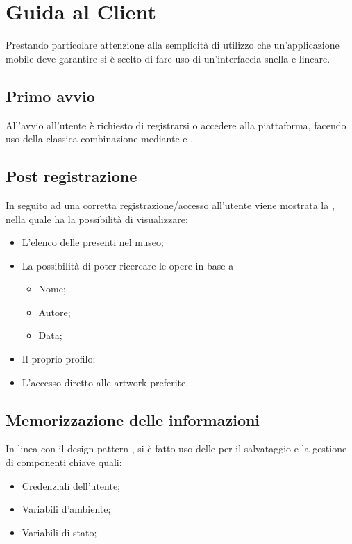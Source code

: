   \section{Guida al Client}
    Prestando particolare attenzione alla semplicità di utilizzo che un'applicazione mobile deve garantire si è scelto di fare uso di un’interfaccia snella e lineare.
    \subsection{Primo avvio}
      All'avvio all'utente è richiesto di registrarsi o accedere alla piattaforma, facendo uso della classica combinazione mediante  e .

    \subsection{Post registrazione}
      In seguito ad una corretta registrazione/accesso all'utente viene mostrata la , nella quale ha la possibilità di visualizzare:
      \begin{itemize}
        \item L'elenco delle  presenti nel museo;
        \item La possibilità di poter ricercare le opere in base a
          \begin{itemize}
            \item Nome;
            \item Autore;
            \item Data;
          \end{itemize}
        \item Il proprio profilo;
        \item L'accesso diretto alle artwork preferite.
      \end{itemize}
    \subsection{Memorizzazione delle informazioni}
    In linea con il design pattern  \footnotemark {}, si è fatto uso delle \href{https://developer.android.com/reference/android/content/SharedPreferences}{} per il salvataggio e la gestione di componenti chiave quali:
      \begin{itemize}
        \item Credenziali dell'utente;
        \item Variabili d'ambiente;
        \item Variabili di stato;
      \end{itemize}
    
